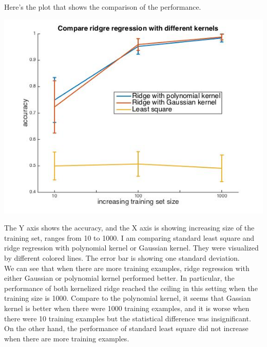 \documentclass[paper=a4, fontsize=11pt]{scrartcl} %
\numberwithin{equation}{section} %
\numberwithin{figure}{section} %
\numberwithin{table}{section} %
\begin{document}
Here's the plot that shows the comparison of the performance. 
\begin{center}
\includegraphics[scale=.5]{hw8_4_compareRidge.jpg}
\end{center}

The Y axis shows the accuracy, and the X axis is showing increasing size of the training set, ranges from 10 to 1000. I am comparing standard least square and ridge regression with polynomial kernel or Gaussian kernel. They were visualized by different colored lines. The error bar is showing one standard deviation. \\

We can see that when there are more training examples, ridge regression with either Gaussian or polynomial kernel performed better. In particular, the performance of both kernelized ridge reached the ceiling in this setting when the training size is 1000. Compare to the polynomial kernel, it seems that Gassian kernel is better when there were 1000 training examples, and it is worse when there were 10 training examples but the statistical difference was insignificant. \\

On the other hand, the performance of standard least square did not increase when there are more training examples. \\
\end{document}
